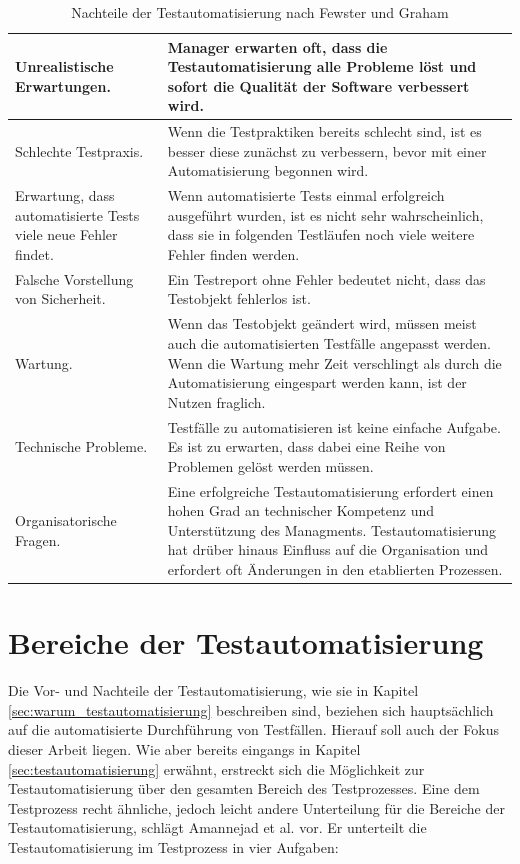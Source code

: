 \begin{table}
\begin{tabular}{p{}|p{}}
Unrealistische Erwartungen.
& Manager erwarten oft, dass die Testautomatisierung alle Probleme löst und sofort die Qualität der Software verbessert wird. \\
\hline 
Schlechte Testpraxis.
& Wenn die Testpraktiken bereits schlecht sind, ist es besser diese zunächst zu verbessern, bevor mit einer Automatisierung begonnen wird. \\ 
\hline 
Erwartung, dass automatisierte Tests viele neue Fehler findet. & 
Wenn automatisierte Tests einmal erfolgreich ausgeführt wurden, ist es nicht sehr wahrscheinlich, dass sie in folgenden Testläufen noch viele weitere Fehler finden werden.\\ 
\hline 
Falsche Vorstellung von Sicherheit. & Ein Testreport ohne Fehler bedeutet nicht, dass das Testobjekt fehlerlos ist.  \\ 
\hline 
Wartung. & Wenn das Testobjekt geändert wird, müssen meist auch die automatisierten Testfälle angepasst werden. Wenn die Wartung mehr Zeit verschlingt als durch die Automatisierung eingespart werden kann, ist der Nutzen fraglich.  \\ 
\hline 
Technische Probleme. & Testfälle zu automatisieren ist keine einfache Aufgabe. Es ist zu erwarten, dass dabei eine Reihe von Problemen gelöst werden müssen. \\ 
\hline 
Organisatorische Fragen. & Eine erfolgreiche Testautomatisierung erfordert einen hohen Grad an technischer Kompetenz und Unterstützung des Managments. Testautomatisierung hat drüber hinaus Einfluss auf die Organisation und erfordert oft Änderungen in den etablierten Prozessen. \\ 
\end{tabular} 
\caption{Nachteile der Testautomatisierung nach Fewster und Graham \cite{fewster_software_1999}}
\label{tbl:nachteile_testautomatisierung}
\end{table}





\section{Bereiche der Testautomatisierung}
\label{sec:bereiche_der_estautomatisierung}

Die Vor- und Nachteile der Testautomatisierung, wie sie in Kapitel \ref{sec:warum_testautomatisierung} beschreiben sind, beziehen sich hauptsächlich auf die automatisierte Durchführung von Testfällen. Hierauf soll auch der Fokus dieser Arbeit liegen. Wie aber bereits eingangs in Kapitel \ref{sec:testautomatisierung} erwähnt, erstreckt sich die Möglichkeit zur Testautomatisierung über den gesamten Bereich des Testprozesses.
Eine dem Testprozess recht ähnliche, jedoch leicht andere Unterteilung für die Bereiche der Testautomatisierung, schlägt Amannejad et al. \cite{amannejad_search-based_2014} vor.
Er unterteilt die Testautomatisierung im Testprozess in vier Aufgaben:

